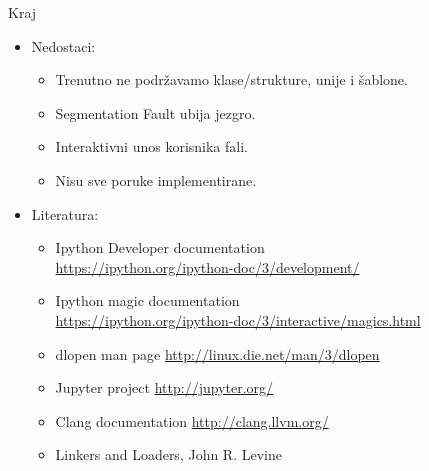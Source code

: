 \documentclass{beamer}
\begin{document}
\begin{frame}{Kraj}
  \begin {itemize}
\item{ Nedostaci:
    \begin{itemize}
    \item {Trenutno ne podržavamo klase/strukture, unije i šablone.}
    \item {Segmentation Fault ubija jezgro.}
    \item {Interaktivni  unos korisnika fali.}
    \item {Nisu sve poruke implementirane.}
  \end{itemize}
    }


  \item{ Literatura:
      \begin{itemize}
\item {
Ipython Developer documentation \\
    \scriptsize
\url{https://ipython.org/ipython-doc/3/development/}
}

\item {
Ipython magic documentation \\
    \scriptsize
\url{ https://ipython.org/ipython-doc/3/interactive/magics.html }
}

\item {
dlopen man page 
    \scriptsize
\url{ http://linux.die.net/man/3/dlopen}
}


\item {
Jupyter project 
    \scriptsize
\url{http://jupyter.org/}
}

\item {
Clang documentation 
    \scriptsize
\url{http://clang.llvm.org/}
}

\item {
Linkers and Loaders,  John R. Levine \\
    \scriptsize
}
      \end{itemize}
}
  \end {itemize}
  
\end{frame}
\end{document}
